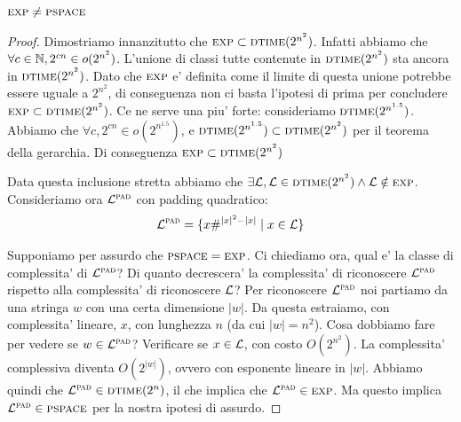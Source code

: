 \begin{thm}
    $\textsc{exp} \not= \textsc{pspace}$
\end{thm}
\begin{proof}
    
    Dimostriamo innanzitutto che $\textsc{exp} \subset \textsc{dtime}(2^{n^{2}})$. Infatti abbiamo che $\forall c
    \in \mathbb{N}, 2^{cn} \in o(2^{n^{2}})$. L'unione di classi tutte contenute in $\textsc{dtime}(2^{n^{2}})$
    sta ancora in $\textsc{dtime}(2^{n^{2}})$. Dato che $\textsc{exp}$ e' definita come il limite di questa unione
    potrebbe essere uguale a $2^{n^{2}}$, di conseguenza non ci basta l'ipotesi di prima per
    concludere $\textsc{exp} \subset \textsc{dtime}(2^{n^{2}})$. Ce ne serve una piu' forte: consideriamo
    $\textsc{dtime}(2^{n^{1.5}})$. Abbiamo che $\forall c,2^{cn} \in o(2^{n^{1.5}})$, e $\textsc{dtime}(2^{n^{1.5}})
    \subset \textsc{dtime}(2^{n^{2}})$ per il teorema della gerarchia. Di conseguenza $\textsc{exp} \subset
    \textsc{dtime}(2^{n^{2}})$

    Data questa inclusione stretta abbiamo che $\exists \mathcal{L}, \mathcal{L} \in \textsc{dtime}(2^{n^{2}}) \land
    \mathcal{L} \notin \textsc{exp}$. Consideriamo ora $\mathcal{L}^{\textsc{pad}}$ con padding quadratico:
    \begin{equation*}
        \mathcal{L}^{\textsc{pad}} = \{ x\#^{|x|^{2}-|x|} \mid x \in \mathcal{L}\}
    \end{equation*}

    Supponiamo per assurdo che $\textsc{pspace} = \textsc{exp}$. Ci chiediamo ora, qual e' la classe di complessita'
    di $\mathcal{L}^{\textsc{pad}}$? Di quanto decrescera' la complessita' di riconoscere $\mathcal{L}^{\textsc{pad}}$ rispetto alla
    complessita' di riconoscere $\mathcal{L}$? Per riconoscere $\mathcal{L}^{\textsc{pad}}$ noi partiamo da una stringa $w$ con
    una certa dimensione $|w|$. Da questa estraiamo, con complessita' lineare, $x$, con lunghezza
    $n$ (da cui $|w| = n^{2}$). Cosa dobbiamo fare per vedere se $w \in \mathcal{L}^{\textsc{pad}}$?  Verificare se $x
    \in \mathcal{L}$, con costo $O(2^{n^{2}})$. La complessita' complessiva diventa $O(2^{|w|})$, ovvero
    con esponente lineare in $|w|$. Abbiamo quindi che $\mathcal{L}^{\textsc{pad}} \in \textsc{dtime}(2^{n})$, il che implica che
    $\mathcal{L}^{\textsc{pad}} \in \textsc{exp}$. Ma questo implica  $\mathcal{L}^{\textsc{pad}} \in \textsc{pspace}$ per la nostra ipotesi di assurdo.


\end{proof}
